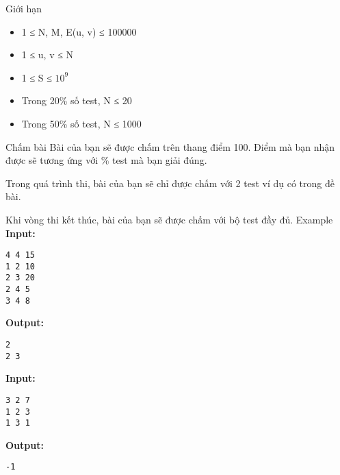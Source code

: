 Giới hạn
\begin{itemize}
	\item 1 ≤ N, M, E(u, v) ≤ 100000
	\item 1 ≤ u, v ≤ N
	\item 1 ≤ S ≤ $10^{9}$
	\item Trong 20\% số test, N ≤ 20
	\item Trong 50\% số test, N ≤ 1000
\end{itemize}
Chấm bài
Bài của bạn sẽ được chấm trên thang điểm 100. Điểm mà bạn nhận được sẽ tương ứng với \% test mà bạn giải đúng.

Trong quá trình thi, bài của bạn sẽ chỉ được chấm với 2 test ví dụ có trong đề bài.

Khi vòng thi kết thúc, bài của bạn sẽ được chấm với bộ test đầy đủ.
Example
\textbf{Input: }
\begin{verbatim}
4 4 15
1 2 10
2 3 20
2 4 5
3 4 8
\end{verbatim}

\textbf{Output: }
\begin{verbatim}
2
2 3 
\end{verbatim}

\textbf{Input: }
\begin{verbatim}
3 2 7
1 2 3
1 3 1
\end{verbatim}

\textbf{Output: }
\begin{verbatim}
-1 \end{verbatim}